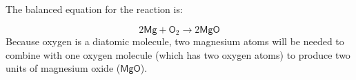         \label{m38684*id138529}The balanced equation for the reaction is:\par 
        \label{m38684*id138535}\nopagebreak\noindent{}
    \begin{equation}
    2\mathsf{Mg}+{\mathsf{O}}_{2}\to 2\mathsf{MgO}\tag{5.2}
      \end{equation}
        \label{m38684*id142521}Because oxygen is a diatomic molecule, two magnesium atoms will be needed to combine with one oxygen molecule (which has two oxygen atoms) to produce two units of magnesium oxide ($\mathsf{MgO}$).\par 
% 
% 
% 			
% 		
% 		
% 	

